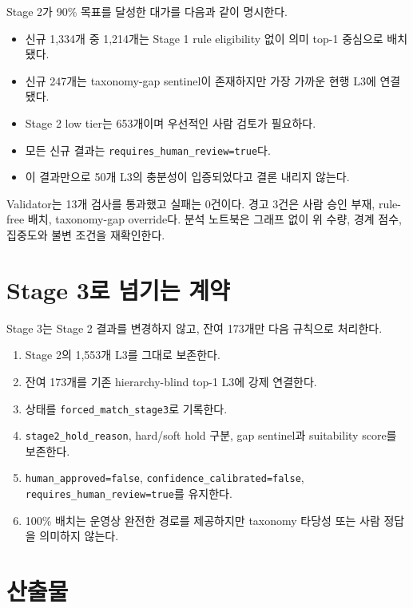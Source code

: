 \documentclass[11pt,a4paper]{article}
\newcommand{\code}[1]{\texttt{#1}}
\begin{document}
Stage 2가 90\% 목표를 달성한 대가를 다음과 같이 명시한다.

\begin{itemize}[leftmargin=2em]
  \item 신규 1,334개 중 1,214개는 Stage 1 rule eligibility 없이 의미 top-1 중심으로 배치됐다.
  \item 신규 247개는 taxonomy-gap sentinel이 존재하지만 가장 가까운 현행 L3에 연결됐다.
  \item Stage 2 low tier는 653개이며 우선적인 사람 검토가 필요하다.
  \item 모든 신규 결과는 \code{requires\_human\_review=true}다.
  \item 이 결과만으로 50개 L3의 충분성이 입증되었다고 결론 내리지 않는다.
\end{itemize}

Validator는 13개 검사를 통과했고 실패는 0건이다. 경고 3건은 사람 승인 부재,
rule-free 배치, taxonomy-gap override다. 분석 노트북은 그래프 없이 위 수량,
경계 점수, 집중도와 불변 조건을 재확인한다.

\section{Stage 3로 넘기는 계약}

Stage 3는 Stage 2 결과를 변경하지 않고, 잔여 173개만 다음 규칙으로 처리한다.

\begin{enumerate}[leftmargin=2em]
  \item Stage 2의 1,553개 L3를 그대로 보존한다.
  \item 잔여 173개를 기존 hierarchy-blind top-1 L3에 강제 연결한다.
  \item 상태를 \code{forced\_match\_stage3}로 기록한다.
  \item \code{stage2\_hold\_reason}, hard/soft hold 구분, gap sentinel과 suitability score를 보존한다.
  \item \code{human\_approved=false}, \code{confidence\_calibrated=false}, \code{requires\_human\_review=true}를 유지한다.
  \item 100\% 배치는 운영상 완전한 경로를 제공하지만 taxonomy 타당성 또는 사람 정답을 의미하지 않는다.
\end{enumerate}

\section*{산출물}
\end{document}
